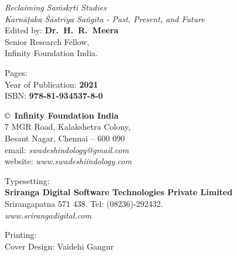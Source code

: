 \thispagestyle{empty}

\noindent
{\fontsize{9}{11}\selectfont\sl Reclaiming Saṁskṛti Studies}\\
\textit{Karnāṭaka Śāstrīya Saṅgīta - Past, Present, and Future}\\
Edited by: \textbf{Dr.~H.~R.~Meera}\\
Senior Research Fellow,\\
Infinity Foundation India.
\vfill

\noindent
Pages: {\bf\pageref{bookend}}\\
Year of Publication: {\bf 2021}\\
ISBN: {\bf 978-81-934537-8-0}\\

\vfill

\noindent
\copyright\ {\bf Infinity Foundation India}\\ 
7 MGR Road, Kalakshetra Colony,\\ 
Besant Nagar, Chennai -- 600 090\\
email: {\sl swadeshindology@gmail.com}\\
website: {\sl www.swadeshiindology.com} 
\vfill

\noindent
Typesetting:\\ 
{\bf Sriranga Digital Software Technologies Private Limited}\\ 
Srirangapatna 571 438. Tel: (08236)-292432.\\
{\sl www.srirangadigital.com}
\vfill

\noindent
Printing:\\

\noindent
Cover Design: Vaidehi Gangur\\ 
